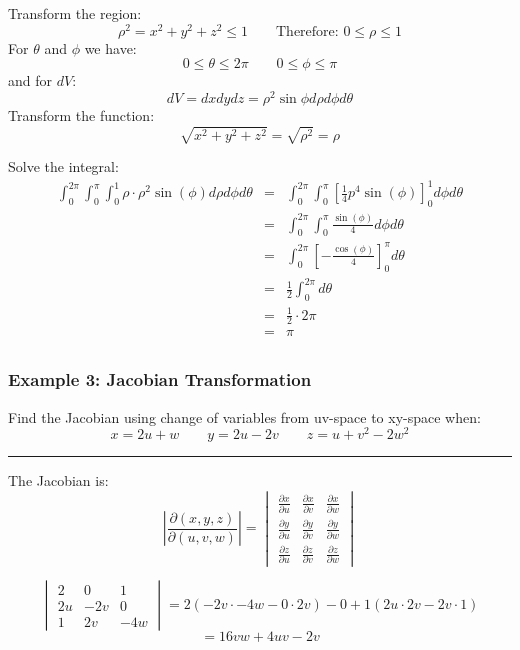 Transform the region:
$$\rho^2=x^2+y^2+z^2\leq 1\qquad \text{Therefore: }0\leq\rho\leq 1$$
For $\theta$ and $\phi$ we have:
$$0\leq\theta\leq 2\pi\qquad 0\leq\phi\leq\pi$$
and for $dV$:
$$dV=dxdydz=\rho^2\sin\phi d\rho d\phi d\theta$$
Transform the function:
$$\sqrt{x^2+y^2+z^2}=\sqrt{\rho^2}=\rho$$

Solve the integral:
\begin{eqnarray*}
  \int_0^{2\pi}\int_0^\pi\int_0^1\rho\cdot\rho^2\sin(\phi) d\rho d\phi d\theta&=&\int_0^{2\pi}\int_0^\pi\left[\frac{1}{4} p^4 \sin (\phi)\right]^1_0d\phi d\theta\\
                                                                              &=& \int_0^{2\pi}\int_0^\pi\frac{\sin (\phi)}{4}d\phi d\theta\\
                                                                              &=& \int_0^{2\pi}\left[-\frac{\cos (\phi)}{4}\right]_0^\pi d\theta\\
                                                                              &=& \frac{1}{2}\int_0^{2\pi}d\theta\\
                                                                              &=& \frac{1}{2}\cdot 2\pi\\
                                                                              &=& \boxed{\pi}\\
\end{eqnarray*}

\subsubsection{Example 3: Jacobian Transformation}
Find the Jacobian using change of variables from uv-space to xy-space when:
$$x=2u+w\qquad y=2u-2v\qquad z=u+v^2-2w^2$$

\rule{\textwidth}{0.5pt}

The Jacobian is:
$$\left|\frac{\partial(x,y,z)}{\partial(u,v,w)}\right|=
\begin{vmatrix}
  \frac{\partial x}{\partial u}&\frac{\partial x}{\partial v}&\frac{\partial x}{\partial w}\\
  \frac{\partial y}{\partial u}&\frac{\partial y}{\partial v}&\frac{\partial y}{\partial w}\\
  \frac{\partial z}{\partial u}&\frac{\partial z}{\partial v}&\frac{\partial z}{\partial w}
\end{vmatrix}$$

$$\begin{vmatrix}
  2&0&1\\
  2u&-2v&0\\
  1&2v&-4w
\end{vmatrix}=2(-2v\cdot-4w-0\cdot2v)-0+1(2u\cdot2v-2v\cdot1)$$
$$=16vw+4uv-2v$$

